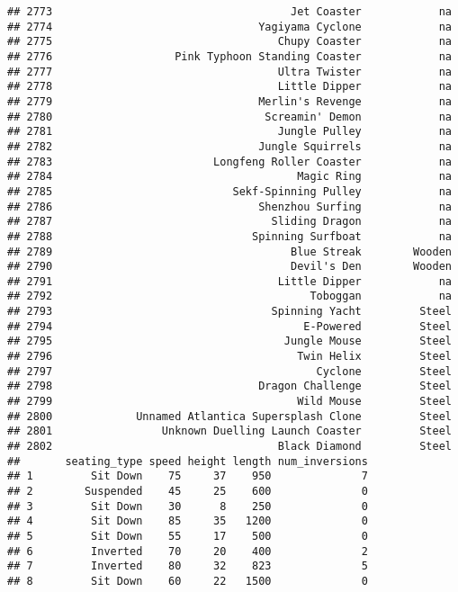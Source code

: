 \documentclass[
]{article}
\begin{document}
\begin{verbatim}
## 2773                                     Jet Coaster            na
## 2774                                Yagiyama Cyclone            na
## 2775                                   Chupy Coaster            na
## 2776                   Pink Typhoon Standing Coaster            na
## 2777                                   Ultra Twister            na
## 2778                                   Little Dipper            na
## 2779                                Merlin's Revenge            na
## 2780                                 Screamin' Demon            na
## 2781                                   Jungle Pulley            na
## 2782                                Jungle Squirrels            na
## 2783                         Longfeng Roller Coaster            na
## 2784                                      Magic Ring            na
## 2785                            Sekf-Spinning Pulley            na
## 2786                                Shenzhou Surfing            na
## 2787                                  Sliding Dragon            na
## 2788                               Spinning Surfboat            na
## 2789                                     Blue Streak        Wooden
## 2790                                     Devil's Den        Wooden
## 2791                                   Little Dipper            na
## 2792                                        Toboggan            na
## 2793                                  Spinning Yacht         Steel
## 2794                                       E-Powered         Steel
## 2795                                    Jungle Mouse         Steel
## 2796                                      Twin Helix         Steel
## 2797                                         Cyclone         Steel
## 2798                                Dragon Challenge         Steel
## 2799                                      Wild Mouse         Steel
## 2800             Unnamed Atlantica Supersplash Clone         Steel
## 2801                 Unknown Duelling Launch Coaster         Steel
## 2802                                   Black Diamond         Steel
##       seating_type speed height length num_inversions
## 1         Sit Down    75     37    950              7
## 2        Suspended    45     25    600              0
## 3         Sit Down    30      8    250              0
## 4         Sit Down    85     35   1200              0
## 5         Sit Down    55     17    500              0
## 6         Inverted    70     20    400              2
## 7         Inverted    80     32    823              5
## 8         Sit Down    60     22   1500              0

\end{verbatim}
\end{document}
